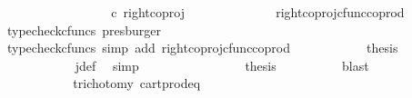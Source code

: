 \begin{isabellebody}
\ \ \ \ \ \ \ \ \isamarkupfalse%
\ \isamarkupfalse%
\ {\isachardoublequoteopen}{\isachardot}{\kern0pt}{\isachardot}{\kern0pt}{\isachardot}{\kern0pt}\ {\isacharequal}{\kern0pt}\ {\isacharparenleft}{\kern0pt}{\isasymlangle}{\isasymt}{\isacharcomma}{\kern0pt}\ {\isasymf}{\isasymrangle}\ {\isasymamalg}{\isasymlangle}{\isasymf}{\isacharcomma}{\kern0pt}\ {\isasymt}{\isasymrangle}{\isacharparenright}{\kern0pt}\ {\isasymcirc}\isactrlsub c\ right{\isacharunderscore}{\kern0pt}coproj\ {\isasymone}\ {\isasymone}{\isachardoublequoteclose}\isanewline
\ \ \ \ \ \ \ \ \ \ \isamarkupfalse%
\ right{\isacharunderscore}{\kern0pt}coproj{\isacharunderscore}{\kern0pt}cfunc{\isacharunderscore}{\kern0pt}coprod\ \isamarkupfalse%
\ {\isacharparenleft}{\kern0pt}typecheck{\isacharunderscore}{\kern0pt}cfuncs{\isacharcomma}{\kern0pt}\ presburger{\isacharparenright}{\kern0pt}\isanewline
\ \ \ \ \ \ \ \ \isamarkupfalse%
\ \isamarkupfalse%
\ {\isachardoublequoteopen}{\isachardot}{\kern0pt}{\isachardot}{\kern0pt}{\isachardot}{\kern0pt}\ {\isacharequal}{\kern0pt}\ {\isasymlangle}{\isasymf}{\isacharcomma}{\kern0pt}\ {\isasymt}{\isasymrangle}{\isachardoublequoteclose}\isanewline
\ \ \ \ \ \ \ \ \ \ \isamarkupfalse%
\ {\isacharparenleft}{\kern0pt}typecheck{\isacharunderscore}{\kern0pt}cfuncs{\isacharcomma}{\kern0pt}\ simp\ add{\isacharcolon}{\kern0pt}\ right{\isacharunderscore}{\kern0pt}coproj{\isacharunderscore}{\kern0pt}cfunc{\isacharunderscore}{\kern0pt}coprod{\isacharparenright}{\kern0pt}\isanewline
\ \ \ \ \ \ \ \ \isamarkupfalse%
\ \isamarkupfalse%
\ {\isacharquery}{\kern0pt}thesis\isanewline
\ \ \ \ \ \ \ \ \ \ \isamarkupfalse%
\ j{\isacharunderscore}{\kern0pt}def\ \isamarkupfalse%
\ simp\isanewline
\ \ \ \ \ \ \isamarkupfalse%
\isanewline
\ \ \ \ \ \ \isamarkupfalse%
\ \isamarkupfalse%
\ {\isacharquery}{\kern0pt}thesis\isanewline
\ \ \ \ \ \ \ \ \isamarkupfalse%
\ blast\isanewline
\ \ \ \ \isamarkupfalse%
\isanewline
\ \ \isamarkupfalse%
\isanewline
\ \ \ \ \isamarkupfalse%
\ \isamarkupfalse%
\ {\isachardoublequoteopen}{\isasymt}\ {\isacharequal}{\kern0pt}\ {\isasymf}{\isachardoublequoteclose}\isanewline
\ \ \ \ \ \ \isamarkupfalse%
\ trichotomy\ cart{\isacharunderscore}{\kern0pt}prod{\isacharunderscore}{\kern0pt}eq{}\ \isamarkupfalse%

\end{isabellebody}
